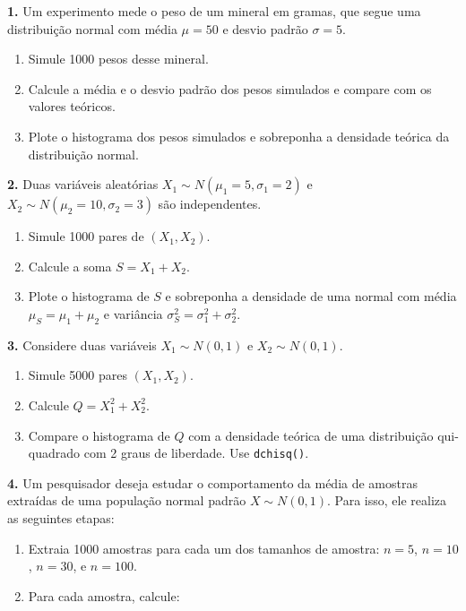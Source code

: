 \documentclass[
]{book}
\begin{document}
\textbf{1.} Um experimento mede o peso de um mineral em gramas, que segue uma distribuição normal com média \(\mu = 50\) e desvio padrão \(\sigma = 5\).

\begin{enumerate}
\def\labelenumi{(\alph{enumi})}
\item
  Simule 1000 pesos desse mineral.
\item
  Calcule a média e o desvio padrão dos pesos simulados e compare com os valores teóricos.
\item
  Plote o histograma dos pesos simulados e sobreponha a densidade teórica da distribuição normal.
\end{enumerate}

\textbf{2.} Duas variáveis aleatórias \(X_1 \sim N(\mu_1=5, \sigma_1=2)\) e \(X_2 \sim N(\mu_2=10, \sigma_2=3)\) são independentes.

\begin{enumerate}
\def\labelenumi{(\alph{enumi})}
\item
  Simule 1000 pares de \((X_1, X_2)\).
\item
  Calcule a soma \(S = X_1 + X_2\).
\item
  Plote o histograma de \(S\) e sobreponha a densidade de uma normal com média \(\mu_S = \mu_{1} + \mu_{2}\) e variância \(\sigma_S^2 = \sigma_{1}^2 + \sigma_{2}^2\).
\end{enumerate}

\textbf{3.} Considere duas variáveis \(X_1 \sim N(0, 1)\) e \(X_2 \sim N(0, 1)\).

\begin{enumerate}
\def\labelenumi{(\alph{enumi})}
\item
  Simule 5000 pares \((X_1, X_2)\).
\item
  Calcule \(Q = X_1^2 + X_2^2\).
\item
  Compare o histograma de \(Q\) com a densidade teórica de uma distribuição qui-quadrado com 2 graus de liberdade. Use \texttt{dchisq()}.
\end{enumerate}

\textbf{4.} Um pesquisador deseja estudar o comportamento da média de amostras extraídas de uma população normal padrão \(X \sim N(0, 1)\). Para isso, ele realiza as seguintes etapas:

\begin{enumerate}
\def\labelenumi{(\alph{enumi})}
\item
  Extraia 1000 amostras para cada um dos tamanhos de amostra: \(n=5\), \(n = 10\), \(n = 30\), e \(n = 100\).
\item
  Para cada amostra, calcule:
\end{enumerate}
\end{document}
